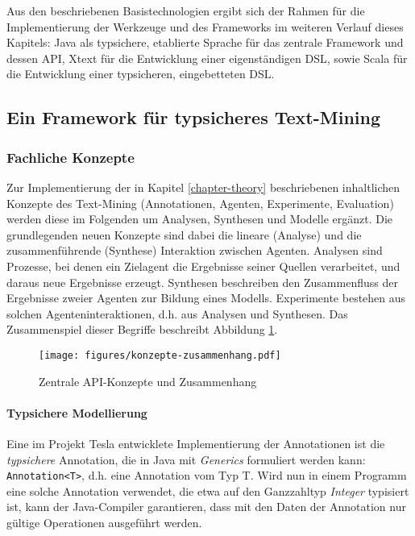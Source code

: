 \documentclass[abstracton, 12pt]{scrartcl}
\begin{document}
Aus den beschriebenen Basistechnologien ergibt sich der Rahmen für die Implementierung der Werkzeuge und des Frameworks im weiteren Verlauf dieses Kapitels: Java als typsichere, etablierte Sprache für das zentrale Framework und dessen API, Xtext für die Entwicklung einer eigenständigen DSL, sowie Scala für die Entwicklung einer typsicheren, eingebetteten DSL.

\subsection{Ein Framework für typsicheres Text-Mining} \label{werk-api} \label{section-api}

\subsubsection{Fachliche Konzepte} \label{api-fach}

Zur Implementierung der in Kapitel \ref{chapter-theory} beschriebenen inhaltlichen Konzepte des Text-Mining (Annotationen, Agenten, Experimente, Evaluation) werden diese im Folgenden um Analysen, Synthesen und Modelle ergänzt. Die grundlegenden neuen Konzepte sind dabei die lineare (Analyse) und die zusammenführende (Synthese) Interaktion zwischen Agenten. Analysen sind Prozesse, bei denen ein Zielagent die Ergebnisse seiner Quellen verarbeitet, und daraus neue Ergebnisse erzeugt. Synthesen beschreiben den Zusammenfluss der Ergebnisse zweier Agenten zur Bildung eines Modells. Experimente bestehen aus solchen Agenteninteraktionen, d.h. aus Analysen und Synthesen. Das Zusammenspiel dieser Begriffe beschreibt Abbildung \ref{konzepte-zusammenhang}.

\begin{figure}
\begin{center}
  \texttt{[image: figures/konzepte-zusammenhang.pdf]}
  \caption{Zentrale API-Konzepte und Zusammenhang}
  \label{konzepte-zusammenhang}
\end{center}
\end{figure}

\paragraph{Typsichere Modellierung}   

Eine im Projekt Tesla \citep{HermesAndSchwiebert2007} entwicklete Implementierung der Annotationen ist die \emph{typsichere} Annotation, die in Java mit \emph{Generics} formuliert werden kann: \lstinline!Annotation<T>!, d.h. eine Annotation vom Typ T. Wird nun in einem Programm eine solche Annotation verwendet, die etwa auf den Ganzzahltyp \emph{Integer} typisiert ist, kann der Java-Compiler garantieren, dass mit den Daten der Annotation nur gültige Operationen ausgeführt werden.
\end{document}
